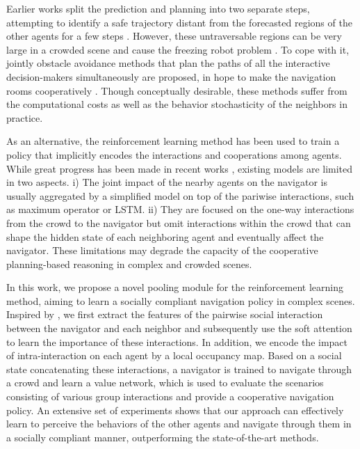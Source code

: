 \documentclass[letterpaper, 10 pt, conference]{ieeeconf}  %
\begin{document}
Earlier works split the prediction and planning into two separate steps, attempting to identify a safe trajectory distant from the forecasted regions of the other agents for a few steps \cite{bennewitz_learning_2005,aoude_probabilistically_2013}. However, these untraversable regions can be very large in a crowded scene and cause the freezing robot problem \cite{trautman_unfreezing_2010}. To cope with it, jointly obstacle avoidance methods that plan the paths of all the interactive decision-makers simultaneously are proposed, in hope to make the navigation rooms cooperatively \cite{trautman_unfreezing_2010}. Though conceptually desirable, these methods suffer from the computational costs as well as the behavior stochasticity of the neighbors in practice. 

As an alternative, the reinforcement learning method has been used to train a policy that implicitly encodes the interactions and cooperations among agents. While great progress has been made in recent works \cite{chen_decentralized_2016,chen_socially_2017,long_towards_2017,everett_motion_2018}, existing models are limited in two aspects. i) The joint impact of the nearby agents on the navigator is usually aggregated by a simplified model on top of the pariwise interactions, such as maximum operator or LSTM. ii) They are focused on the one-way interactions from the crowd to the navigator but omit interactions within the crowd that can shape the hidden state of each neighboring agent and eventually affect the navigator. These limitations may degrade the capacity of the cooperative planning-based reasoning in complex and crowded scenes. 

In this work, we propose a novel pooling module for the reinforcement learning method, aiming to learn a socially compliant navigation policy in complex scenes. Inspired by \cite{alahi_social_2016,gupta_social_2018,vemula_social_2017}, we first extract the features of the pairwise social interaction between the navigator and each neighbor and subsequently use the soft attention to learn the importance of these interactions. In addition, we encode the impact of intra-interaction on each agent by a local occupancy map. Based on a social state concatenating these interactions, a navigator is trained to navigate through a crowd and learn a value network, which is used to evaluate the scenarios consisting of various group interactions and provide a cooperative navigation policy. An extensive set of experiments shows that our approach can effectively learn to perceive the behaviors of the other agents and navigate through them in a socially compliant manner, outperforming the state-of-the-art methods. 
\end{document}
